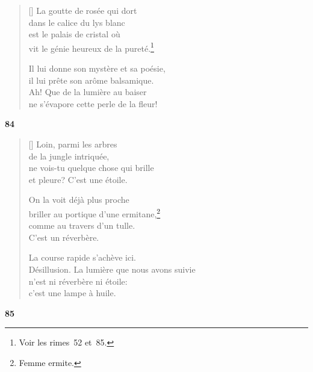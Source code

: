 \documentclass[a4paper,12pt]{book}
\begin{document}
\settowidth{\versewidth}{Il lui donne son mystère et sa poésie,}


\begin{verse}[\versewidth]
  La goutte de rosée qui dort \\
  dans le calice du lys blanc \\
  est le palais de cristal où \\
  vit le génie heureux de la pureté.\footnote{Voir les rimes~52 et~85.}

  Il lui donne son mystère et sa poésie, \\
  il lui prête son arôme balsamique. \\
  Ah! Que de la lumière au baiser \\
  ne s'évapore cette perle de la fleur!
\end{verse}

\bigskip

\begin{center}
  \textbf{84}
\end{center}

\settowidth{\versewidth}{Désillusion. La lumière que nous avons suivie}

\begin{verse}[\versewidth]
  Loin, parmi les arbres \\
  de la jungle intriquée, \\
  ne vois-tu quelque chose qui brille \\
  et pleure? C'est une étoile.

  On la voit déjà plus proche \\
  briller au portique d'une ermitane,\footnote{Femme ermite.} \\
  comme au travers d'un tulle. \\
  C'est un réverbère.

  La course rapide s'achève ici. \\
  Désillusion. La lumière que nous avons suivie \\
  n'est ni réverbère ni étoile: \\
  c'est une lampe à huile.
\end{verse}

\bigskip

\begin{center}
  \textbf{85}
\end{center}
\end{document}
